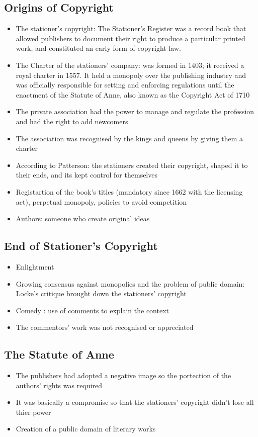 \documentclass{article}
\begin{document}
\subsection{Origins of Copyright} 
\begin{itemize}
\item The stationer's copyright: The Stationer's Register was a record book that allowed publishers to document their right to produce a particular printed work, and constituted an early form of copyright law. 
\item The Charter of the stationers' company: was formed in 1403; it received a royal charter in 1557. It held a monopoly over the publishing industry and was officially responsible for setting and enforcing regulations until the enactment of the Statute of Anne, also known as the Copyright Act of 1710
\item The private association had the power to manage and regulate the profession and had the right to add newcomers 
\item The association was recognised by the kings and queens by giving them a charter 
\item According to Patterson: the stationers created their copyright, shaped it to their ends, and its kept control for themselves 
\item Registartion of the book's titles (mandatory since 1662 with the licensing act), perpetual monopoly, policies to avoid competition
\item Authors: someone who create original ideas 
\end{itemize}

\subsection{End of Stationer's Copyright}
\begin{itemize}
\item Enlightment
\item Growing consensus against monopolies and the problem of public domain: Locke's critique brought down the stationers' copyright 
\item Comedy : use of comments to explain the context 
\item The commentors' work was not recognised or appreciated 
\end{itemize}

\subsection{The Statute of Anne}
\begin{itemize}
\item The publishers had adopted a negative image so the portection of the authors' rights was required 
\item It was basically a compromise so that the stationers' copyright didn't lose all thier power 
\item Creation of a public domain of literary works 
\end{itemize}
\end{document}
